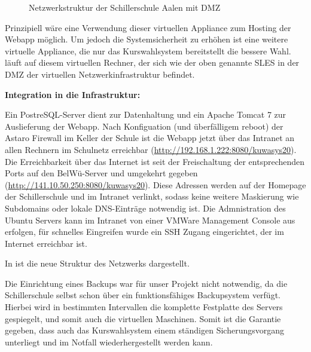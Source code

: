 \begin{figure}[H]
\begin{center}
\end{center}
\caption[\textbf{Netzwerkstruktur der Schillerschule Aalen}]{Netzwerkstruktur der Schillerschule Aalen mit DMZ}
\label{fig:Netzwerkstruktur}
\end{figure}

Prinzipiell wäre eine Verwendung dieser virtuellen \gls{Appliance} zum Hosting der \ac{Webapp} möglich. Um jedoch die Systemsicherheit zu erhöhen ist eine weitere virtuelle Appliance, die nur das Kurswahlsystem bereitstellt die bessere Wahl.
 läuft auf diesem virtuellen Rechner, der sich wie der oben genannte SLES in der \gls{DMZ} der virtuellen Netzwerkinfrastruktur befindet.

\textbf{Integration in die Infrastruktur:}

Ein PostreSQL-Server dient zur Datenhaltung und ein Apache Tomcat 7 zur Auslieferung der \ac{Webapp}. Nach Konfiguation (und überfälligem reboot) der Astaro Firewall im Keller der Schule ist die Webapp jetzt über das Intranet an allen Rechnern im Schulnetz erreichbar (\url{http://192.168.1.222:8080/kuwasys20}). Die Erreichbarkeit über das Internet ist seit der Freischaltung der entsprechenden Ports auf den BelWü-Server und umgekehrt gegeben (\url{http://141.10.50.250:8080/kuwasys20}).
Diese Adressen werden auf der Homepage der Schillerschule und im Intranet verlinkt, sodass keine weitere Maskierung wie Subdomains oder lokale DNS-Einträge notwendig ist.
Die Admnistration des Ubuntu Servers kann im Intranet von einer VMWare Management Console aus erfolgen, für schnelles Eingreifen wurde ein SSH Zugang eingerichtet, der im Internet erreichbar ist.

In  ist die neue Struktur des Netzwerks dargestellt.

Die Einrichtung eines Backups war für unser Projekt nicht notwendig, da die Schillerschule selbst schon über ein funktionsfähiges Backupsystem verfügt. Hierbei wird in bestimmten Intervallen die komplette Festplatte des Servers gespiegelt, und somit auch die virtuellen Maschinen.
Somit ist die Garantie gegeben, dass auch das Kurswahlsystem einem ständigen Sicherungsvorgang unterliegt und im Notfall wiederhergestellt werden kann.
